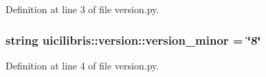 \-Definition at line 3 of file version.\-py.

\hypertarget{namespaceuicilibris_1_1version_abebe26f12f2b7b3aa2ed3878c6b4848d}{
\subsubsection[{version\-\_\-minor}]{\setlength{\rightskip}{0pt plus 5cm}string {\bf uicilibris\-::version\-::version\-\_\-minor} = \char`\"{}8\char`\"{}}}\label{namespaceuicilibris_1_1version_abebe26f12f2b7b3aa2ed3878c6b4848d}


\-Definition at line 4 of file version.\-py.

